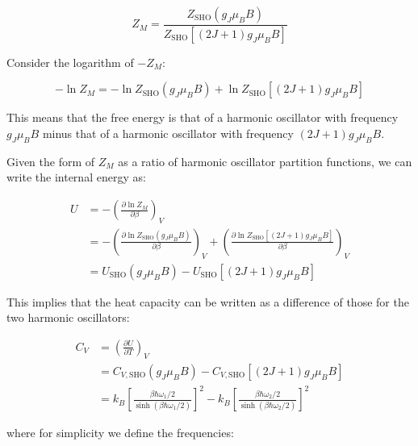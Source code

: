 \documentclass[12pt]{article}
\begin{document}
\begin{equation}
    Z_{M} = \frac{Z_{\text{SHO}}(g_{J} \mu_{B} B)}{Z_{\text{SHO}}[(2J + 1)g_{J} \mu_{B} B]}
\end{equation}

Consider the logarithm of $-Z_{M}$:

\begin{equation}
    -\ln{Z_{M}} = -\ln{Z_{\text{SHO}}(g_{J} \mu_{B} B)} + \ln{Z_{\text{SHO}}[(2J + 1)g_{J} \mu_{B} B]}
\end{equation}

This means that the free energy is that of a harmonic oscillator with frequency $g_{J} \mu_{B} B$ minus that of a harmonic oscillator with frequency $(2J + 1)g_{J} \mu_{B} B$.

Given the form of $Z_{M}$ as a ratio of harmonic oscillator partition functions, we can write the internal energy as:

\begin{equation}
    \begin{split}
        U &= -\left( \frac{\partial \ln{Z_{M}}}{\partial \beta} \right)_{V} \\
        &= -\left( \frac{\partial \ln{Z_{\text{SHO}}(g_{J} \mu_{B} B)}}{\partial \beta} \right)_{V} + \left( \frac{\partial \ln{Z_{\text{SHO}}[(2J + 1)g_{J} \mu_{B} B]}}{\partial \beta} \right)_{V} \\
        &= U_{\text{SHO}}(g_{J} \mu_{B} B) - U_{\text{SHO}}[(2J + 1)g_{J} \mu_{B} B]
    \end{split}
\end{equation}

This implies that the heat capacity can be written as a difference of those for the two harmonic oscillators:

\begin{equation}
    \begin{split}
        C_{V} &= \left( \frac{\partial U}{\partial T} \right)_{V} \\
        &= C_{V, \text{SHO}}(g_{J} \mu_{B} B) - C_{V, \text{SHO}}[(2J + 1)g_{J} \mu_{B} B] \\
        &= k_{B} \left[ \frac{\beta \hbar \omega_{1}/2}{\sinh\left( \beta \hbar \omega_{1}/2 \right)} \right]^{2} - k_{B} \left[ \frac{\beta \hbar \omega_{2}/2}{\sinh\left( \beta \hbar \omega_{2}/2 \right)} \right]^{2}
    \end{split}
\end{equation}

where for simplicity we define the frequencies:
\end{document}
